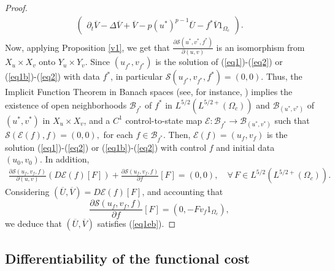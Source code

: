 \documentclass[11pt,reqno]{amsart}%
\numberwithin{equation}{section}
\begin{document}
{\begin{proof}
\begin{eqnarray*}
\begin{pmatrix}
\partial_t \overline{V} -\Delta \overline{V} + \overline{V} -p (u^*)^{p-1} {\overline{U}}-f^*\overline{V}1_{\Omega_c}
\end{pmatrix}.
\end{eqnarray*}
Now, applying Proposition \ref{v1},  we get that
  $\frac{\partial\mathcal{S}(u^*,v^*,f^*)}{\partial(u,v)}$ is an isomorphism from 
 $X_{ u} \times X_{v} $ onto 
 $ Y_u\times Y_v$.
 Since $(u_{f^*},v_{f^*})$ is the  solution of (\ref{eq1})-(\ref{eq2}) or (\ref{eq1b})-(\ref{eq2}) with data $f^*$,  
 in particular $\mathcal{S}(u_{f^*},v_{f^*},f^*)=(0,0)$.
 Thus, the Implicit Function Theorem in Banach spaces (see, for instance, \cite[Theorem 3.13]{Kumar}) implies the existence of open neighborhoods 
 $\mathcal{B}_{f^*}$ of $f^*$ in $L^{5/2}(L^{5/2+}(\Omega_c))$ and $\mathcal{B}_{(u^*,v^*)}$ of $(u^*,v^*)$ in $X_u\times X_v$,  and a $C^1$ control-to-state map 
 $\mathcal{E}:\mathcal{B}_{f^*} \rightarrow \mathcal{B}_{(u^*,v^*)}$ such that $\mathcal{S}(\mathcal{E}(f),f)=(0,0),$ for each $f\in \mathcal{B}_{f^*}$. 
Then, $\mathcal{E}(f)=(u_{f},v_{f})$ is the  solution (\ref{eq1})-(\ref{eq2}) or (\ref{eq1b})-(\ref{eq2}) with control $f$ and initial data $(u_0,v_0).$ In addition,
\begin{eqnarray*}
\frac{\partial\mathcal{S}(u_f,v_f,f)}{\partial(u,v)} (D\mathcal{E}(f)[F])
+
\frac{\partial\mathcal{S}(u_f,v_f,f)}{\partial f}[F]=(0,0),\quad  \forall\, F\in  L^{5/2}(L^{5/2+}(\Omega_c)).
\end{eqnarray*}
Considering $(\overline{U},\overline{V})=D\mathcal{E}(f)[F]$, and accounting that 
$$  
\frac{\partial\mathcal{S}(u_f,v_f,f)}{\partial f}[F]=(0, -F v_f 1_{\Omega_c}),
$$
we deduce that $(\overline{U},\overline{V})$ satisfies (\ref{eq1eb}).
 \end{proof}
 
 \subsection{Differentiability of the functional cost}
 

}
\end{document}

